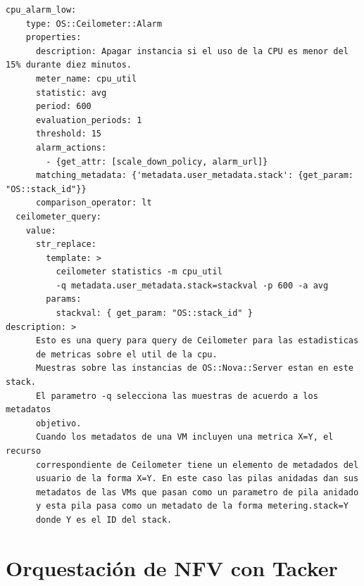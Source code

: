 \begin{lstlisting}[style=Consola]
  cpu_alarm_low:
    type: OS::Ceilometer::Alarm
    properties:
      description: Apagar instancia si el uso de la CPU es menor del 15% durante diez minutos.
      meter_name: cpu_util
      statistic: avg
      period: 600
      evaluation_periods: 1
      threshold: 15
      alarm_actions:
        - {get_attr: [scale_down_policy, alarm_url]}
      matching_metadata: {'metadata.user_metadata.stack': {get_param: "OS::stack_id"}}
      comparison_operator: lt
  ceilometer_query:
    value:
      str_replace:
        template: >
          ceilometer statistics -m cpu_util
          -q metadata.user_metadata.stack=stackval -p 600 -a avg
        params:
          stackval: { get_param: "OS::stack_id" }
description: >
      Esto es una query para query de Ceilometer para las estadisticas
      de metricas sobre el util de la cpu.
      Muestras sobre las instancias de OS::Nova::Server estan en este stack.
      El parametro -q selecciona las muestras de acuerdo a los metadatos
      objetivo.
      Cuando los metadatos de una VM incluyen una metrica X=Y, el recurso
      correspondiente de Ceilometer tiene un elemento de metadados del
      usuario de la forma X=Y. En este caso las pilas anidadas dan sus
      metadatos de las VMs que pasan como un parametro de pila anidado
      y esta pila pasa como un metadato de la forma metering.stack=Y
      donde Y es el ID del stack.
\end{lstlisting}











\section{Orquestación de NFV con Tacker}
